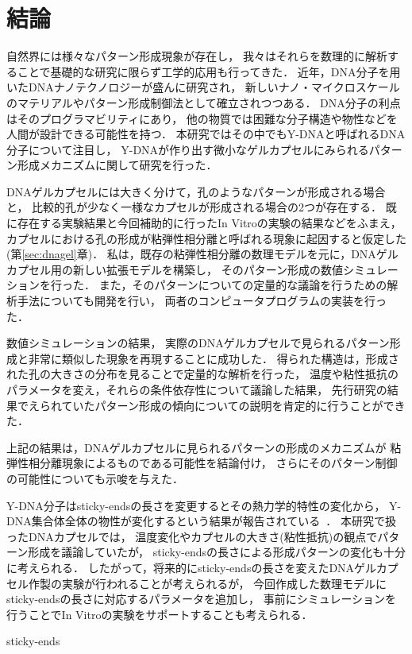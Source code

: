 \chapter{結論}

自然界には様々なパターン形成現象が存在し，
我々はそれらを数理的に解析することで基礎的な研究に限らず工学的応用も行ってきた．
近年，DNA分子を用いたDNAナノテクノロジーが盛んに研究され，
新しいナノ・マイクロスケールのマテリアルやパターン形成制御法として確立されつつある．
DNA分子の利点はそのプログラマビリティにあり，
他の物質では困難な分子構造や物性などを人間が設計できる可能性を持つ．
本研究ではその中でもY-DNAと呼ばれるDNA分子について注目し，
Y-DNAが作り出す微小なゲルカプセルにみられるパターン形成メカニズムに関して研究を行った．

DNAゲルカプセルには大きく分けて，孔のようなパターンが形成される場合と，
比較的孔が少なく一様なカプセルが形成される場合の2つが存在する．
既に存在する実験結果と今回補助的に行ったIn Vitroの実験の結果などをふまえ，
カプセルにおける孔の形成が粘弾性相分離と呼ばれる現象に起因すると仮定した(第\ref{sec:dnagel}章)．
私は，既存の粘弾性相分離の数理モデルを元に，DNAゲルカプセル用の新しい拡張モデルを構築し，
そのパターン形成の数値シミュレーションを行った．
また，そのパターンについての定量的な議論を行うための解析手法についても開発を行い，
両者のコンピュータプログラムの実装を行った．

数値シミュレーションの結果，
実際のDNAゲルカプセルで見られるパターン形成と非常に類似した現象を再現することに成功した．
得られた構造は，形成された孔の大きさの分布を見ることで定量的な解析を行った，
温度や粘性抵抗のパラメータを変え，それらの条件依存性について議論した結果，
先行研究の結果でえられていたパターン形成の傾向についての説明を肯定的に行うことができた．

上記の結果は，DNAゲルカプセルに見られるパターンの形成のメカニズムが
粘弾性相分離現象によるものである可能性を結論付け，
さらにそのパターン制御の可能性についても示唆を与えた．

Y-DNA分子はsticky-endsの長さを変更するとその熱力学的特性の変化から，
Y-DNA集合体全体の物性が変化するという結果が報告されている~\cite{sato2019sequence}．
本研究で扱ったDNAカプセルでは，
温度変化やカプセルの大きさ(粘性抵抗)の観点でパターン形成を議論していたが，
sticky-endsの長さによる形成パターンの変化も十分に考えられる．
したがって，将来的にsticky-endsの長さを変えたDNAゲルカプセル作製の実験が行われることが考えられるが，
今回作成した数理モデルにsticky-endsの長さに対応するパラメータを追加し，
事前にシミュレーションを行うことでIn Vitroの実験をサポートすることも考えられる．

sticky-ends


